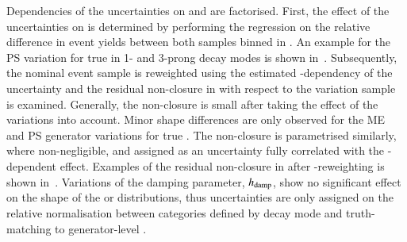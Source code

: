 Dependencies of the uncertainties on \tauhadvis \pT and \mTW are
factorised. First, the effect of the uncertainties on \tauhadvis \pT
is determined by performing the regression on the relative difference
in event yields between both samples binned in \tauhadvis \pT. An
example for the PS variation for true \tauhadvis in 1- and 3-prong
decay modes is shown
in~. Subsequently,
the nominal event sample is reweighted using the estimated
\pT-dependency of the uncertainty and the residual non-closure in \mTW
with respect to the variation sample is examined. Generally, the
non-closure is small after taking the \tauhadvis \pT effect of the
variations into account. Minor shape differences are only observed for
the ME and PS generator variations for true \tauhadvis. The
non-closure is parametrised similarly, where non-negligible, and
assigned as an uncertainty fully correlated with the \pT-dependent
effect. Examples of the residual non-closure in \mTW after
\pT-reweighting is shown
in~. Variations
of the damping parameter, $h_\mathrm{damp}$, show no significant effect on the
shape of the \tauhadvis \pT or \mTW distributions, thus uncertainties
are only assigned on the relative normalisation between categories
defined by \tauhadvis decay mode and truth-matching to generator-level
\tauhad.


